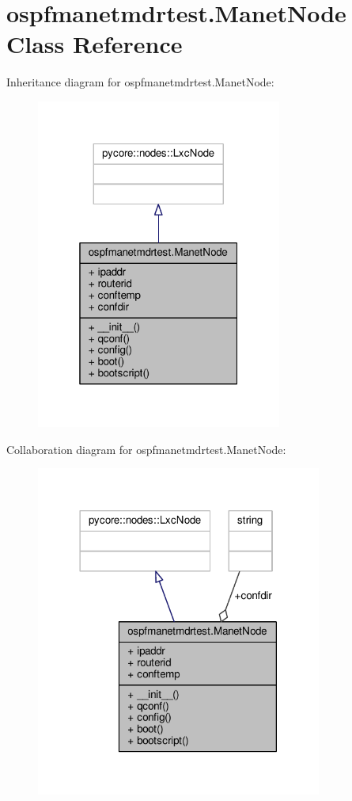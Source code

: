 \hypertarget{classospfmanetmdrtest_1_1_manet_node}{\section{ospfmanetmdrtest.\+Manet\+Node Class Reference}
\label{classospfmanetmdrtest_1_1_manet_node}
}


Inheritance diagram for ospfmanetmdrtest.\+Manet\+Node\+:
\nopagebreak
\begin{figure}[H]
\begin{center}
\leavevmode
\includegraphics[width=229pt]{classospfmanetmdrtest_1_1_manet_node__inherit__graph}
\end{center}
\end{figure}


Collaboration diagram for ospfmanetmdrtest.\+Manet\+Node\+:
\nopagebreak
\begin{figure}[H]
\begin{center}
\leavevmode
\includegraphics[width=266pt]{classospfmanetmdrtest_1_1_manet_node__coll__graph}
\end{center}
\end{figure}
